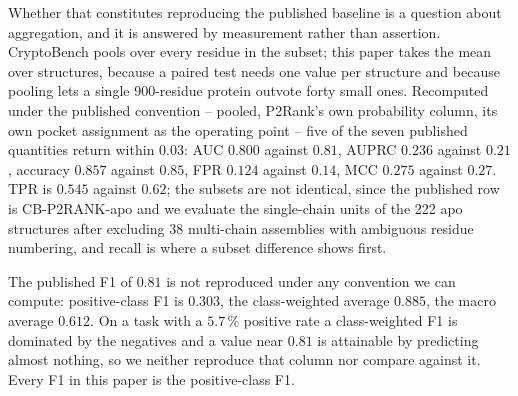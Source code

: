 \documentclass[11pt]{article}
\begin{document}
Whether that constitutes reproducing the published baseline is a question about
aggregation, and it is answered by measurement rather than assertion.
CryptoBench pools over every residue in the subset; this paper takes the mean
over structures, because a paired test needs one value per structure and because
pooling lets a single 900-residue protein outvote forty small ones. Recomputed
under the published convention -- pooled, P2Rank's own probability column, its
own pocket assignment as the operating point -- five of the seven published
quantities return within 0.03: AUC \(0.800\) against \(0.81\), AUPRC \(0.236\)
against \(0.21\), accuracy \(0.857\) against \(0.85\), FPR \(0.124\) against
\(0.14\), MCC \(0.275\) against \(0.27\). TPR is \(0.545\) against \(0.62\); the
subsets are not identical, since the published row is CB-P2RANK-apo and we
evaluate the \NUnits{} single-chain units of the 222 apo structures after
excluding 38 multi-chain assemblies with ambiguous residue numbering, and recall
is where a subset difference shows first.

The published F1 of \(0.81\) is not reproduced under any convention we can
compute: positive-class F1 is \(0.303\), the class-weighted average \(0.885\),
the macro average \(0.612\). On a task with a \(5.7\,\%\) positive rate a
class-weighted F1 is dominated by the negatives and a value near \(0.81\) is
attainable by predicting almost nothing, so we neither reproduce that column nor
compare against it. Every F1 in this paper is the positive-class F1.
\end{document}
